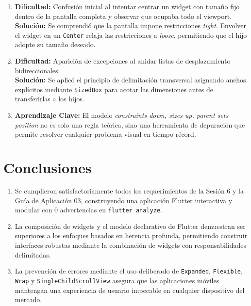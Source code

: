 \documentclass[12pt,a4paper]{article}
\begin{document}
\begin{enumerate}[leftmargin=*]
    \item \textbf{Dificultad:} Confusión inicial al intentar centrar un widget con tamaño fijo dentro de la pantalla completa y observar que ocupaba todo el viewport.\\
    \textbf{Solución:} Se comprendió que la pantalla impone restricciones \textit{tight}. Envolver el widget en un \texttt{Center} relaja las restricciones a \textit{loose}, permitiendo que el hijo adopte su tamaño deseado.
    \item \textbf{Dificultad:} Aparición de excepciones al anidar listas de desplazamiento bidireccionales.\\
    \textbf{Solución:} Se aplicó el principio de delimitación transversal asignando anchos explícitos mediante \texttt{SizedBox} para acotar las dimensiones antes de transferirlas a los hijos.
    \item \textbf{Aprendizaje Clave:} El modelo \textit{constraints down, sizes up, parent sets position} no es solo una regla teórica, sino una herramienta de depuración que permite resolver cualquier problema visual en tiempo récord.
\end{enumerate}

\section{Conclusiones}

\begin{enumerate}[leftmargin=*]
    \item Se cumplieron satisfactoriamente todos los requerimientos de la Sesión 6 y la Guía de Aplicación 03, construyendo una aplicación Flutter interactiva y modular con 0 advertencias en \texttt{flutter analyze}.
    \item La composición de widgets y el modelo declarativo de Flutter demuestran ser superiores a los enfoques basados en herencia profunda, permitiendo construir interfaces robustas mediante la combinación de widgets con responsabilidades delimitadas.
    \item La prevención de errores mediante el uso deliberado de \texttt{Expanded}, \texttt{Flexible}, \texttt{Wrap} y \texttt{SingleChildScrollView} asegura que las aplicaciones móviles mantengan una experiencia de usuario impecable en cualquier dispositivo del mercado.
\end{enumerate}
\end{document}
